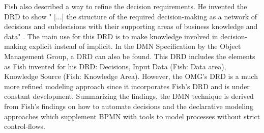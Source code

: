Fish also described a way to refine the decision requirements. He invented the \ac{DRD} to show " [...] the structure of the required decision-making as a network of decisions and subdecisions with their supporting areas of business knowledge and data" \cite{Fish2012}. The main use for this DRD is to make knowledge involved in decision-making explicit instead of implicit. 
In the \ac{DMN} Specification by the Object Management Group, a DRD can also be found. This DRD includes the elements as Fish invented for his DRD: Decisions, Input Data (Fish: Data area), Knowledge Source (Fish: Knowledge Area). However, the OMG's DRD is a much more refined modeling approach since it incorporates Fish's DRD and is under constant development. 
Summarizing the findings, the DMN technique is derived from Fish's findings on how to automate decisions and the declarative modeling approaches which supplement BPMN with tools to model processes without strict control-flows.  